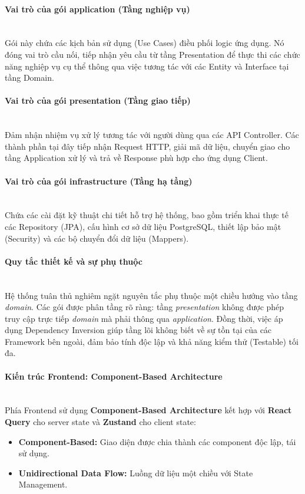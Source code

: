 \paragraph{Vai trò của gói application (Tầng nghiệp vụ)} ~\\
Gói này chứa các kịch bản sử dụng (Use Cases) điều phối logic ứng dụng. Nó đóng vai trò cầu nối, tiếp nhận yêu cầu từ tầng Presentation để thực thi các chức năng nghiệp vụ cụ thể thông qua việc tương tác với các Entity và Interface tại tầng Domain.

\paragraph{Vai trò của gói presentation (Tầng giao tiếp)} ~\\
Đảm nhận nhiệm vụ xử lý tương tác với người dùng qua các API Controller. Các thành phần tại đây tiếp nhận Request HTTP, giải mã dữ liệu, chuyển giao cho tầng Application xử lý và trả về Response phù hợp cho ứng dụng Client.

\paragraph{Vai trò của gói infrastructure (Tầng hạ tầng)} ~\\
Chứa các cài đặt kỹ thuật chi tiết hỗ trợ hệ thống, bao gồm triển khai thực tế các Repository (JPA), cấu hình cơ sở dữ liệu PostgreSQL, thiết lập bảo mật (Security) và các bộ chuyển đổi dữ liệu (Mappers).

\paragraph{Quy tắc thiết kế và sự phụ thuộc} ~\\
Hệ thống tuân thủ nghiêm ngặt nguyên tắc phụ thuộc một chiều hướng vào tầng \textit{domain}. Các gói được phân tầng rõ ràng: tầng \textit{presentation} không được phép truy cập trực tiếp \textit{domain} mà phải thông qua \textit{application}. Đồng thời, việc áp dụng Dependency Inversion giúp tầng lõi không biết về sự tồn tại của các Framework bên ngoài, đảm bảo tính độc lập và khả năng kiểm thử (Testable) tối đa.

\paragraph{Kiến trúc Frontend: Component-Based Architecture} ~\\
Phía Frontend sử dụng \textbf{Component-Based Architecture} kết hợp với \textbf{React Query} cho server state và \textbf{Zustand} cho client state:
\begin{itemize}
    \item \textbf{Component-Based:} Giao diện được chia thành các component độc lập, tái sử dụng.
    \item \textbf{Unidirectional Data Flow:} Luồng dữ liệu một chiều với State Management.
\end{itemize}

